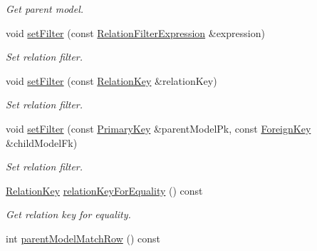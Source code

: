 \begin{DoxyCompactItemize}
\begin{DoxyCompactList}\small\item\em Get parent model. \end{DoxyCompactList}\item 
void \hyperlink{class_mdt_1_1_item_model_1_1_relation_filter_proxy_model_a55c2fc2383af03d01ef92e7eb4ddc426}{set\+Filter} (const \hyperlink{class_mdt_1_1_item_model_1_1_relation_filter_expression}{Relation\+Filter\+Expression} \&expression)
\begin{DoxyCompactList}\small\item\em Set relation filter. \end{DoxyCompactList}\item 
void \hyperlink{class_mdt_1_1_item_model_1_1_relation_filter_proxy_model_acafb87324b21aadda724dbdf837b2aee}{set\+Filter} (const \hyperlink{class_mdt_1_1_item_model_1_1_relation_key}{Relation\+Key} \&relation\+Key)
\begin{DoxyCompactList}\small\item\em Set relation filter. \end{DoxyCompactList}\item 
void \hyperlink{class_mdt_1_1_item_model_1_1_relation_filter_proxy_model_a7b540895b780173c73eeb344a65b6684}{set\+Filter} (const \hyperlink{class_mdt_1_1_item_model_1_1_primary_key}{Primary\+Key} \&parent\+Model\+Pk, const \hyperlink{class_mdt_1_1_item_model_1_1_foreign_key}{Foreign\+Key} \&child\+Model\+Fk)
\begin{DoxyCompactList}\small\item\em Set relation filter. \end{DoxyCompactList}\item 
\hyperlink{class_mdt_1_1_item_model_1_1_relation_key}{Relation\+Key} \hyperlink{class_mdt_1_1_item_model_1_1_relation_filter_proxy_model_a1d98dffc2809657b92796b67bb8a8d57}{relation\+Key\+For\+Equality} () const \hypertarget{class_mdt_1_1_item_model_1_1_relation_filter_proxy_model_a1d98dffc2809657b92796b67bb8a8d57}{}\label{class_mdt_1_1_item_model_1_1_relation_filter_proxy_model_a1d98dffc2809657b92796b67bb8a8d57}

\begin{DoxyCompactList}\small\item\em Get relation key for equality. \end{DoxyCompactList}\item 
int \hyperlink{class_mdt_1_1_item_model_1_1_relation_filter_proxy_model_a1694b272495c06184786801e89aa5b32}{parent\+Model\+Match\+Row} () const \hypertarget{class_mdt_1_1_item_model_1_1_relation_filter_proxy_model_a1694b272495c06184786801e89aa5b32}{}\label{class_mdt_1_1_item_model_1_1_relation_filter_proxy_model_a1694b272495c06184786801e89aa5b32}


\end{DoxyCompactItemize}
